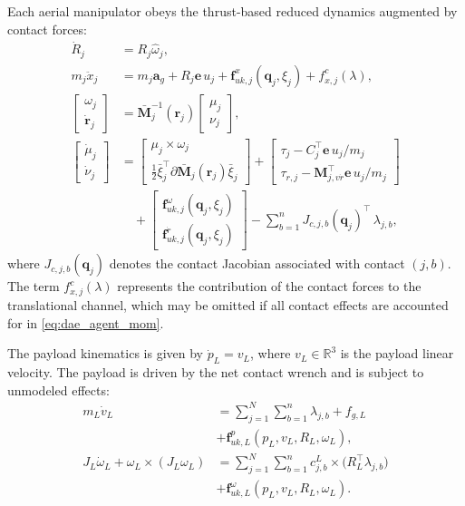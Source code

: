 \documentclass[letterpaper, 10 pt, conference]{ieeeconf}  %
\newcommand{\0}{\matr{0}}
\begin{document}
Each aerial manipulator obeys the thrust-based reduced dynamics augmented by contact forces:
\begin{align}
\dot R_j &= R_j\hat\omega_j,\label{eq:dae_agent_R}\\
m_j\ddot x_j &= m_j\mathbf a_g + R_j\mathbf e\,u_j
+ \mathbf f^{x}_{uk,j}(\mathbf q_j,\xi_j)
+ f^{c}_{x,j}(\lambda),\label{eq:dae_agent_x}\\
\begin{bmatrix}\omega_j\\ \dot{\mathbf r}_j\end{bmatrix}
&=\bar{\mathbf M}_j^{-1}(\mathbf r_j)
\begin{bmatrix}\mu_j\\ \nu_j\end{bmatrix},\label{eq:dae_agent_kin}\\
\begin{bmatrix}\dot\mu_j\\ \dot\nu_j\end{bmatrix}
&=
\begin{bmatrix}
\mu_j\times\omega_j\\
\frac12\bar\xi_j^\top\partial\bar{\mathbf M}_j(\mathbf r_j)\bar\xi_j
\end{bmatrix}
+
\begin{bmatrix}
\tau_j - C_j^\top\mathbf e\,u_j/m_j\\
\tau_{r,j}-\mathbf M_{j,v\dot{r}}^\top\mathbf e\,u_j/m_j
\end{bmatrix}\nonumber\\
&\quad+
\begin{bmatrix}
\mathbf f^{\omega}_{uk,j}(\mathbf q_j,\xi_j)\\
\mathbf f^{\dot r}_{uk,j}(\mathbf q_j,\xi_j)
\end{bmatrix}
-\sum_{b=1}^{n}
J_{c,j,b}(\mathbf q_j)^\top\,\lambda_{j,b},
\label{eq:dae_agent_mom}
\end{align}
where $J_{c,j,b}(\mathbf q_j)$ denotes the contact Jacobian associated with contact $(j,b)$.
The term $f^{c}_{x,j}(\lambda)$ represents the contribution of the contact forces to the
translational channel, which may be omitted if all contact effects are accounted for in
\eqref{eq:dae_agent_mom}.

The payload kinematics is given by $\dot p_L = v_L$, where $v_L\in\mathbb R^3$ is the payload linear velocity. The payload is driven by the net contact wrench and is subject to unmodeled effects:
\begin{align}
m_L\dot v_L &=
\sum_{j=1}^{N}\sum_{b=1}^{n} \lambda_{j,b}
+ f_{g,L}
\nonumber\\&
+ \mathbf f^{p}_{uk,L}(p_L,v_L,R_L,\omega_L),
\label{eq:dae_payload_trans}\\
J_L\dot\omega_L + \omega_L\times(J_L\omega_L)
&=
\sum_{j=1}^{N}\sum_{b=1}^{n}
c^L_{j,b}\times\big(R_L^\top\lambda_{j,b}\big)\nonumber
\\&+ \mathbf f^{\omega}_{uk,L}(p_L,v_L,R_L,\omega_L).
\label{eq:dae_payload_rot}
\end{align}
\end{document}
